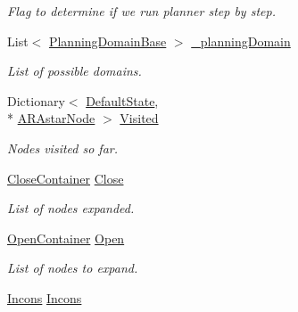 \begin{DoxyCompactItemize}
\begin{DoxyCompactList}\small\item\em Flag to determine if we run planner step by step. \end{DoxyCompactList}\item 
\hypertarget{class_a_r_astar_planner_ad9b64f26b9a88475f983c4eb493de054}{List$<$ \hyperlink{class_planning_domain_base}{Planning\-Domain\-Base} $>$ \hyperlink{class_a_r_astar_planner_ad9b64f26b9a88475f983c4eb493de054}{\-\_\-planning\-Domain}}\label{class_a_r_astar_planner_ad9b64f26b9a88475f983c4eb493de054}

\begin{DoxyCompactList}\small\item\em List of possible domains. \end{DoxyCompactList}\item 
\hypertarget{class_a_r_astar_planner_aee2b292cb501a1495c039524e1ad8e94}{Dictionary$<$ \hyperlink{class_default_state}{Default\-State}, \\*
\hyperlink{class_a_r_astar_node}{A\-R\-Astar\-Node} $>$ \hyperlink{class_a_r_astar_planner_aee2b292cb501a1495c039524e1ad8e94}{Visited}}\label{class_a_r_astar_planner_aee2b292cb501a1495c039524e1ad8e94}

\begin{DoxyCompactList}\small\item\em Nodes visited so far. \end{DoxyCompactList}\item 
\hypertarget{class_a_r_astar_planner_af023a548cb94909a1b2c0e51988502b5}{\hyperlink{class_close_container}{Close\-Container} \hyperlink{class_a_r_astar_planner_af023a548cb94909a1b2c0e51988502b5}{Close}}\label{class_a_r_astar_planner_af023a548cb94909a1b2c0e51988502b5}

\begin{DoxyCompactList}\small\item\em List of nodes expanded. \end{DoxyCompactList}\item 
\hypertarget{class_a_r_astar_planner_ad5c4d105b353c64c6f0eab3d543d68dc}{\hyperlink{class_open_container}{Open\-Container} \hyperlink{class_a_r_astar_planner_ad5c4d105b353c64c6f0eab3d543d68dc}{Open}}\label{class_a_r_astar_planner_ad5c4d105b353c64c6f0eab3d543d68dc}

\begin{DoxyCompactList}\small\item\em List of nodes to expand. \end{DoxyCompactList}\item 
\hypertarget{class_a_r_astar_planner_ab01b3701ca3e0de21ee17603597e14e9}{\hyperlink{class_incons}{Incons} \hyperlink{class_a_r_astar_planner_ab01b3701ca3e0de21ee17603597e14e9}{Incons}}\label{class_a_r_astar_planner_ab01b3701ca3e0de21ee17603597e14e9}


\end{DoxyCompactItemize}
